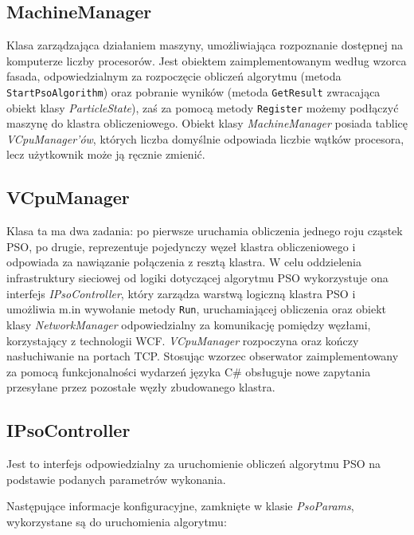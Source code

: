 \documentclass[12pt, twoside, openany, abstract=on]{report}
\theoremstyle{definition}
\begin{document}
\subsection{MachineManager}
Klasa zarządzająca działaniem maszyny, umożliwiająca rozpoznanie dostępnej na komputerze liczby procesorów. Jest obiektem zaimplementowanym według wzorca fasada, odpowiedzialnym za rozpoczęcie obliczeń algorytmu \newline (metoda \texttt{StartPsoAlgorithm}) oraz pobranie wyników (metoda \texttt{GetResult} zwracająca obiekt klasy \textit{ParticleState}), zaś za pomocą metody \texttt{Register} możemy podłączyć maszynę do klastra obliczeniowego. Obiekt klasy \textit{MachineManager} posiada tablicę \textit{VCpuManager'ów}, których liczba domyślnie odpowiada liczbie wątków procesora, lecz użytkownik może ją ręcznie zmienić.

\subsection{VCpuManager}
Klasa ta ma dwa zadania: 
po pierwsze uruchamia obliczenia jednego roju cząstek PSO, po drugie, reprezentuje pojedynczy węzeł klastra obliczeniowego i odpowiada za nawiązanie połączenia z resztą klastra. W celu oddzielenia infrastruktury sieciowej od logiki dotyczącej algorytmu PSO wykorzystuje ona interfejs \textit{IPsoController}, który zarządza warstwą logiczną klastra PSO i umożliwia m.in wywołanie metody \texttt{Run}, uruchamiającej obliczenia oraz obiekt klasy \textit{NetworkManager} odpowiedzialny za komunikację pomiędzy węzłami, korzystający z technologii WCF. \textit{VCpuManager} rozpoczyna oraz kończy nasłuchiwanie na portach TCP. Stosując wzorzec obserwator zaimplementowany za pomocą funkcjonalności wydarzeń języka C\# obsługuje nowe zapytania przesyłane przez pozostałe węzły zbudowanego klastra.

\subsection{IPsoController}
Jest to interfejs odpowiedzialny za uruchomienie obliczeń algorytmu PSO na podstawie podanych parametrów wykonania.

Następujące informacje konfiguracyjne, zamknięte w klasie \textit{PsoParams}, wykorzystane są do uruchomienia algorytmu:  
\end{document}
